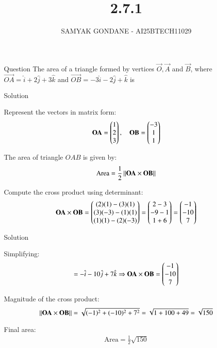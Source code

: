 \documentclass{beamer}
\title 
{2.7.1}
\date{}
\author
{SAMYAK GONDANE - AI25BTECH11029}
\begin{document}
\frame{\titlepage}

\begin{frame}{Question}
The area of a triangle formed by vertices $\vec{O}, \vec{A}$ and $\vec{B}$, where $\vec{OA} = \hat{i} + 2\hat{j} + 3\hat{k}$ and $\vec{OB} = -3\hat{i} - 2\hat{j} + \hat{k}$ is
\end{frame}

\begin{frame}{Solution}

Represent the vectors in matrix form:
\begin{align}
\mathbf{OA} = \begin{pmatrix}1 \\ 2 \\ 3\end{pmatrix}, \quad
\mathbf{OB} = \begin{pmatrix}-3 \\ 1 \\ 1\end{pmatrix}
\end{align}

The area of triangle $OAB$ is given by:
\begin{align}
\text{Area} = \frac{1}{2} \left\lVert\mathbf{OA} \times \mathbf{OB}\right\rVert
\end{align}

Compute the cross product using determinant:
\begin{align}
\mathbf{OA} \times \mathbf{OB} =
\begin{pmatrix}
(2)(1) - (3)(1) \\
(3)(-3) - (1)(1) \\
(1)(1) - (2)(-3)
\end{pmatrix}
=
\begin{pmatrix}
2 - 3 \\
-9 - 1 \\
1 + 6
\end{pmatrix}
=
\begin{pmatrix}
-1 \\
-10 \\
7
\end{pmatrix}
\end{align}

\end{frame}

\begin{frame}{Solution}

Simplifying:
\begin{align}
= -\hat{i} - 10\hat{j} + 7\hat{k}
\Rightarrow \mathbf{OA} \times \mathbf{OB} = \begin{pmatrix}-1 \\ -10 \\ 7\end{pmatrix}
\end{align}

Magnitude of the cross product:
\begin{align}
\left\lVert\mathbf{OA} \times \mathbf{OB}\right\rVert = \sqrt{(-1)^2 + (-10)^2 + 7^2} = \sqrt{1 + 100 + 49} = \sqrt{150}
\end{align}

Final area:
\begin{align}
\text{Area} = \frac{1}{2} \sqrt{150}
\end{align}

\end{frame}
\end{document}
